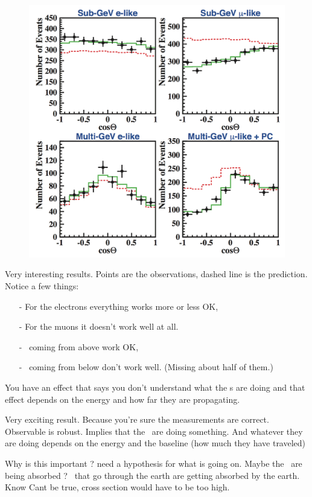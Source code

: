 {\begin{figure}[h!]
\centering
\includegraphics[width=1.0\textwidth]{./sk.png}
\end{figure}
\clearpage

Very interesting results.
Points are the observations, dashed line is the prediction.
Notice a few things:
\begin{itemize}
\item[-] For the electrons everything works more or less OK, 
\item[-] For the muons it doesn't work well at all.
\item[-] \nus\ coming from above work OK, 
\item[-] \nus\ coming from below don't work well. (Missing about half of them.)
\end{itemize}
You have an effect that says you don't understand what the \numu s are doing and that effect depends on the energy and how far they are propagating.


Very exciting result. 
Because you're sure the measurements are correct. 
Observable is robust. 
Implies that the \nus\ are doing something. 
And whatever they are doing depends on the energy and the baseline (how much they have traveled)

Why is this important ? need a hypothesis for what is going on. 
Maybe the \nus\ are being absorbed ? 
\nus\ that go through the earth are getting absorbed by the earth. 
Know Cant be true,  cross section would have to be too high. 

}
